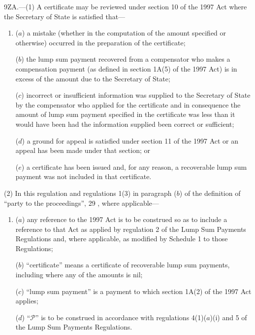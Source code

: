 \documentclass[12pt,a4paper]{article}
\begin{document}
9ZA.---(1)  A certificate may be reviewed under section 10 of the 1997 Act where the Secretary of State is satisfied that—
\begin{enumerate}\item[]
($a$) a mistake (whether in the computation of the amount specified or otherwise) occurred in the preparation of the certificate;

($b$) the lump sum payment recovered from a compensator who makes a compensation payment (as defined in section 1A(5) of the 1997 Act) is in excess of the amount due to the Secretary of State;

($c$) incorrect or insufficient information was supplied to the Secretary of State by the compensator who applied for the certificate and in consequence the amount of lump sum payment specified in the certificate was less than it would have been had the information supplied been correct or sufficient;

($d$) a ground for appeal is satisfied under section 11 of the 1997 Act or an appeal has been made under that section; or

($e$) a certificate has been issued and, for any reason, a recoverable lump sum payment was not included in that certificate.
\end{enumerate}

(2) In this regulation and regulations 1(3) in paragraph ($b$)  of the definition of “party to the proceedings”, 
29%
, where applicable—
\begin{enumerate}\item[]
($a$) any reference to the 1997 Act is to be construed so as to include a reference to that Act as applied by regulation 2 of the Lump Sum Payments Regulations and, where applicable, as modified by Schedule 1 to those Regulations;


($b$) “certificate” means a certificate of recoverable lump sum payments, including where any of the amounts is nil;

($c$) “lump sum payment” is a payment to which section 1A(2) of the 1997 Act  applies;

($d$) “$\mathcal{P}$” is to be construed in accordance with regulations 4(1)($a$)(i)  and 5 of the Lump Sum Payments Regulations.
\end{enumerate}
\end{document}
